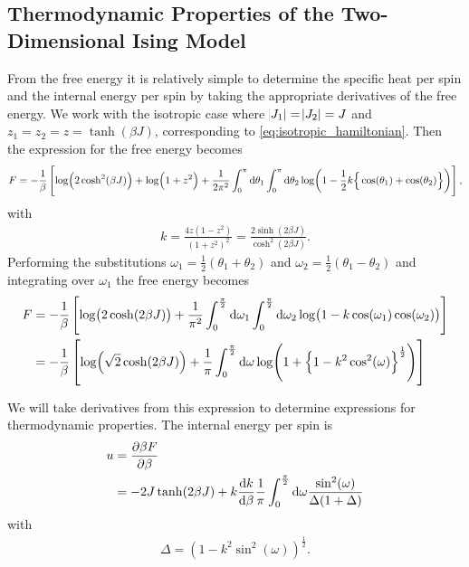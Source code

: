 \documentclass[11pt, a4paper]{report} %
\begin{document}
\subsection{Thermodynamic Properties of the Two-Dimensional Ising Model}
From the free energy it is relatively simple to determine the specific heat per spin and the internal energy per spin by taking the appropriate derivatives of the free energy\cite{mccoy:1973}. We work with the isotropic case where \(\abs{J_1} = \abs{J_2} = J\) and \(z_1 = z_2 = z = \tanh(\beta J)\), corresponding to \cref{eq:isotropic_hamiltonian}.
Then the expression for the free energy becomes
\begin{dmath}
	F = -\frac{1}{\beta} \left[\log(2\cosh^2(\beta J)) + \log(1+z^2) + \frac{1}{2\pi^2} \int_0^{\pi}\dif \theta_1 \int_0^{\pi} \dif \theta_2 \log(1-\frac{1}{2}k \Big\{\cos(\theta_1) + \cos(\theta_2)\Big\})\right],
\end{dmath}
with
\begin{align}
	\label{eq:elliptic_argument}
	k = \frac{4z(1-z^2)}{(1+z^2)^2} = \frac{2\sinh(2\beta J)}{\cosh^2{(2\beta J)}}.
\end{align}
Performing the substitutions \(\omega_1 = \frac{1}{2}(\theta_1 + \theta_2)\) and \(\omega_2 = \frac{1}{2}(\theta_1 - \theta_2)\) and integrating over \(\omega_1\) the free energy becomes
\begin{align}
		F &= -\frac{1}{\beta} \left[\log(2\cosh(2\beta J)) + \frac{1}{\pi^2} \int_0^{\frac{\pi}{2}} \dif \omega_1 \int_0^{\frac{\pi}{2}} \dif \omega_2 \log(1- k \cos(\omega_1)\cos(\omega_2))\right]\\
		&= -\frac{1}{\beta} \left[\log(\sqrt{2}\cosh(2\beta J)) + \frac{1}{\pi} \int_0^{\frac{\pi}{2}} \dif \omega \log(1+\left\{1-k^2 \cos^2(\omega)\right\}^{\frac{1}{2}}) \right]
\end{align}

We will take derivatives from this expression to determine expressions for thermodynamic properties. The internal energy per spin is
\begin{align}
	\label{eq:internal_energy}
	u &= \frac{\partial \beta F}{\partial \beta}\\
	&= -2 J \tanh(2\beta J) + k \frac{\dif k}{\dif \beta} \frac{1}{\pi} \int_0^{\frac{\pi}{2}} \dif \omega \frac{\sin^2(\omega)}{\Delta (1+\Delta)}
\end{align}
with
\begin{align}
	\Delta = \left( 1 - k^2 \sin^2(\omega) \right)^{\frac{1}{2}}.
\end{align}
\end{document}
